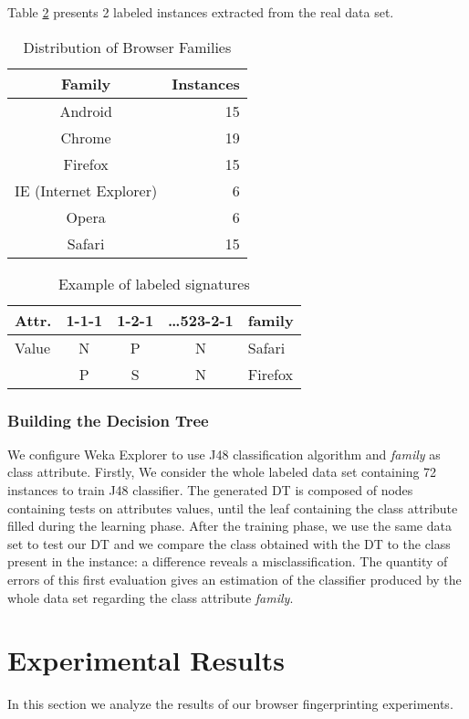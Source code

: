 \documentclass[10pt]{IEEEtran}
\begin{document}
Table \ref{labeledinstance} presents 2 labeled instances extracted from the real data set.
 
\begin{table}
\center
\caption{Distribution of Browser Families\label{family}}
\begin{tabular}{c|r}
\hline
Family & Instances \\
\hline
Android & 15  \\
\hline
Chrome & 19  \\
\hline
Firefox & 15 \\
\hline
IE (Internet Explorer)  & 6   \\
\hline
Opera & 6   \\
\hline
Safari & 15  \\
\hline
\end{tabular}
\end{table}
           
\begin{table}\center
\caption{Example of labeled signatures\label{labeledinstance}}
\begin{tabular}{l|c|c|c|l}
\hline
Attr. &  1-1-1 &  1-2-1 & \ldots523-2-1 & family \\
\hline
Value &  N &  P & N & Safari \\
\cline{2-5}
         &  P & S & N & Firefox \\      
\hline
\end{tabular}
\end{table}
      
       
\subsubsection{Building the Decision Tree}
We configure Weka Explorer to use J48 classification algorithm and \emph{family} as class 
attribute. Firstly, We consider the whole labeled data set containing 72 instances to train J48 
classifier. The generated DT is composed of nodes containing tests on attributes values, 
until the leaf containing the class attribute filled during the learning phase. After the 
training phase, we use the same data set to test our DT and we compare the class obtained 
with the DT to the class present in the instance: a difference reveals a misclassification. 
The quantity of errors of this first evaluation gives an estimation of the classifier 
produced by the whole data set regarding the class attribute \textit{family}.  



\section{Experimental Results}
\label{sec:experimental-results}
In this section we analyze the results of our browser fingerprinting experiments.
\end{document}
